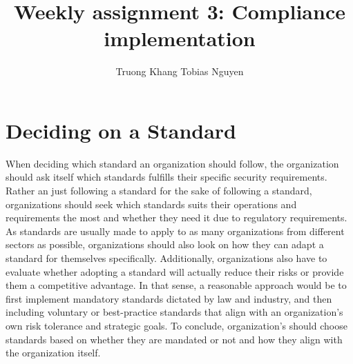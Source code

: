\documentclass[12pt]{article}
\title{Weekly assignment 3: Compliance implementation}
\author{Truong Khang Tobias Nguyen}
\date{}
\begin{document}
\maketitle

\section{Deciding on a Standard}
When deciding which standard an organization should follow, the organization should ask itself which standards fulfills their specific security requirements.
\newline
Rather an just following a standard for the sake of following a standard, organizations should seek which standards suits their operations and requirements the most and whether they need it due to regulatory requirements. As standards are usually made to apply to as many organizations from different sectors as possible, organizations should also look on how they can adapt a standard for themselves specifically.
\newline
Additionally, organizations also have to evaluate whether adopting a standard will actually reduce their risks or provide them a competitive advantage. In that sense, a reasonable approach would be to first implement mandatory standards dictated by law and industry, and then including voluntary or best-practice standards that align with an organization's own risk tolerance and strategic goals.
\newline
To conclude, organization's should choose standards based on whether they are mandated or not and how they align with the organization itself.
\end{document}

